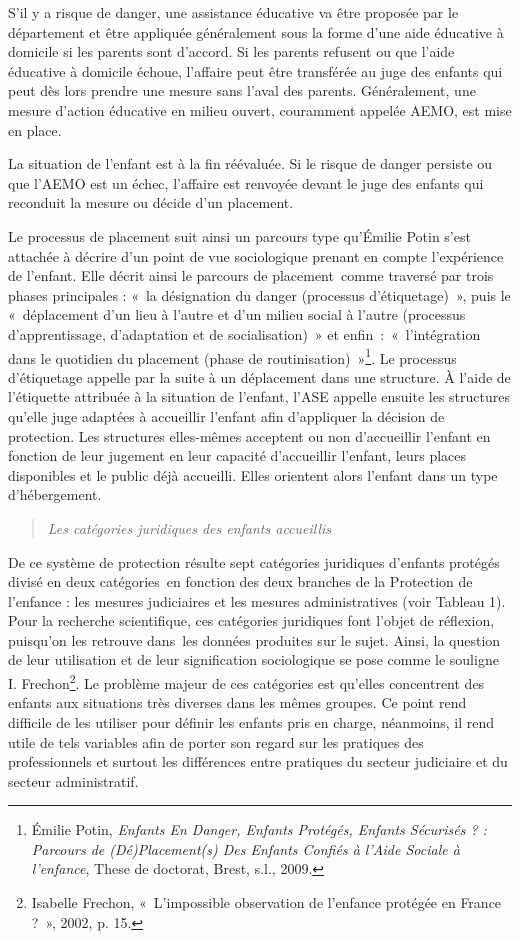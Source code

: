\documentclass[
  12,
  a4paper,
]{report}
\begin{document}
S'il y a risque de danger, une assistance éducative va être proposée par
le département et être appliquée généralement sous la forme d'une aide
éducative à domicile si les parents sont d'accord. Si les parents
refusent ou que l'aide éducative à domicile échoue, l'affaire peut être
transférée au juge des enfants qui peut dès lors prendre une mesure sans
l'aval des parents. Généralement, une mesure d'action éducative en
milieu ouvert, couramment appelée AEMO, est mise en place.

La situation de l'enfant est à la fin réévaluée. Si le risque de danger
persiste ou que l'AEMO est un échec, l'affaire est renvoyée devant le
juge des enfants qui reconduit la mesure ou décide d'un placement.

Le processus de placement suit ainsi un parcours type qu'Émilie Potin
s'est attachée à décrire d'un point de vue sociologique prenant en
compte l'expérience de l'enfant. Elle décrit ainsi le parcours de
placement~comme traversé par trois phases principales : «~la désignation
du danger (processus d'étiquetage)~», puis le «~déplacement d'un lieu à
l'autre et d'un milieu social à l'autre (processus d'apprentissage,
d'adaptation et de socialisation)~» et enfin~:~«~l'intégration dans le
quotidien du placement (phase de routinisation)~»\footnote{Émilie Potin,
  \emph{Enfants En Danger, Enfants Protégés, Enfants Sécurisés ? :
  Parcours de (Dé)Placement(s) Des Enfants Confiés à l'{Aide} Sociale à
  l'enfance}, These de doctorat, {Brest}, s.l., 2009.}. Le processus
d'étiquetage appelle par la suite à un déplacement dans une structure. À
l'aide de l'étiquette attribuée à la situation de l'enfant, l'ASE
appelle ensuite les structures qu'elle juge adaptées à accueillir
l'enfant afin d'appliquer la décision de protection. Les structures
elles-mêmes acceptent ou non d'accueillir l'enfant en fonction de leur
jugement en leur capacité d'accueillir l'enfant, leurs places
disponibles et le public déjà accueilli. Elles orientent alors l'enfant
dans un type d'hébergement.

\begin{quote}
\emph{Les catégories juridiques des enfants accueillis}
\end{quote}

De ce système de protection résulte sept catégories juridiques d'enfants
protégés divisé en deux catégories~en fonction des deux branches de la
Protection de l'enfance : les mesures judiciaires et les mesures
administratives (voir Tableau 1). Pour la recherche scientifique, ces
catégories juridiques font l'objet de réflexion, puisqu'on les retrouve
dans~les données produites sur le sujet. Ainsi, la question de leur
utilisation et de leur signification sociologique se pose comme le
souligne I. Frechon\footnote{Isabelle Frechon, {«~L'impossible
  observation de l'enfance protégée en France ?~»}, 2002, p. 15.}. Le
problème majeur de ces catégories est qu'elles concentrent des enfants
aux situations très diverses dans les mêmes groupes. Ce point rend
difficile de les utiliser pour définir les enfants pris en charge,
néanmoins, il rend utile de tels variables afin de porter son regard sur
les pratiques des professionnels et surtout les différences entre
pratiques du secteur judiciaire et du secteur administratif.
\end{document}
